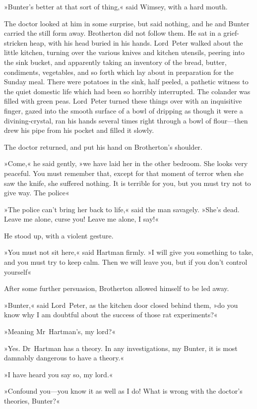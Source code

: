 »Bunter's better at that sort of thing,« said Wimsey, with a hard mouth.

The doctor looked at him in some surprise, but said nothing, and he and Bunter carried the still form away. Brotherton did not follow them. He sat in a grief-stricken heap, with his head buried in his hands. Lord~Peter walked about the little kitchen, turning over the various knives and kitchen utensils, peering into the sink bucket, and apparently taking an inventory of the bread, butter, condiments, vegetables, and so forth which lay about in preparation for the Sunday meal. There were potatoes in the sink, half peeled, a pathetic witness to the quiet domestic life which had been so horribly interrupted. The colander was filled with green peas. Lord~Peter turned these things over with an inquisitive finger, gazed into the smooth surface of a bowl of dripping as though it were a divining-crystal, ran his hands several times right through a bowl of flour—then drew his pipe from his pocket and filled it slowly.

The doctor returned, and put his hand on Brotherton's shoulder.

»Come,« he said gently, »we have laid her in the other bedroom. She looks very peaceful. You must remember that, except for that moment of terror when she saw the knife, she suffered nothing. It is terrible for you, but you must try not to give way. The police\longdash«

»The police can't bring her back to life,« said the man savagely. »She's dead. Leave me alone, curse you! Leave me alone, I say!«

He stood up, with a violent gesture.

»You must not sit here,« said Hartman firmly. »I will give you something to take, and you must try to keep calm. Then we will leave you, but if you don't control yourself\longdash«

After some further persuasion, Brotherton allowed himself to be led away.

»Bunter,« said Lord~Peter, as the kitchen door closed behind them, »do you know why I am doubtful about the success of those rat experiments?«

»Meaning Mr~Hartman's, my lord?«

»Yes. Dr~Hartman has a theory. In any investigations, my Bunter, it is most damnably dangerous to have a theory.«

»I have heard you say so, my lord.«

»Confound you—you know it as well as I do! What is wrong with the doctor's theories, Bunter?«

